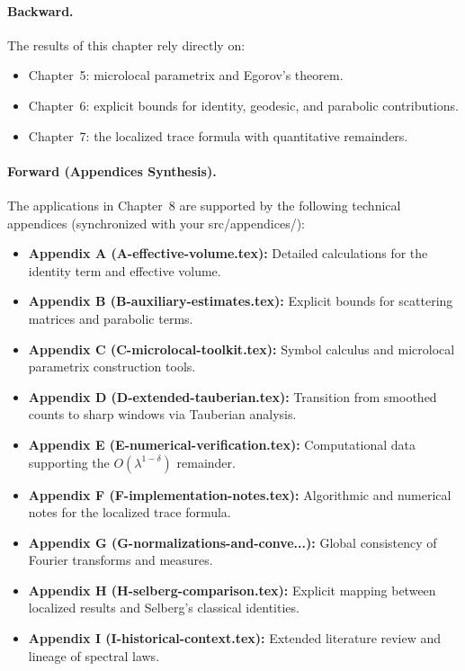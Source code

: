 \paragraph{Backward.}  
The results of this chapter rely directly on:
\begin{itemize}
\item Chapter~5: microlocal parametrix and Egorov’s theorem.  
\item Chapter~6: explicit bounds for identity, geodesic, and parabolic contributions.  
\item Chapter~7: the localized trace formula with quantitative remainders.
\end{itemize}

\paragraph{Forward (Appendices Synthesis).}  
The applications in Chapter~8 are supported by the following technical appendices (synchronized with your src/appendices/):
\begin{itemize}
\item \textbf{Appendix A (A-effective-volume.tex):} Detailed calculations for the identity term and effective volume.
\item \textbf{Appendix B (B-auxiliary-estimates.tex):} Explicit bounds for scattering matrices and parabolic terms.
\item \textbf{Appendix C (C-microlocal-toolkit.tex):} Symbol calculus and microlocal parametrix construction tools.
\item \textbf{Appendix D (D-extended-tauberian.tex):} Transition from smoothed counts to sharp windows via Tauberian analysis.
\item \textbf{Appendix E (E-numerical-verification.tex):} Computational data supporting the $O(\lambda^{1-\delta})$ remainder.
\item \textbf{Appendix F (F-implementation-notes.tex):} Algorithmic and numerical notes for the localized trace formula.
\item \textbf{Appendix G (G-normalizations-and-conve...):} Global consistency of Fourier transforms and measures.
\item \textbf{Appendix H (H-selberg-comparison.tex):} Explicit mapping between localized results and Selberg's classical identities.
\item \textbf{Appendix I (I-historical-context.tex):} Extended literature review and lineage of spectral laws.
\end{itemize}

